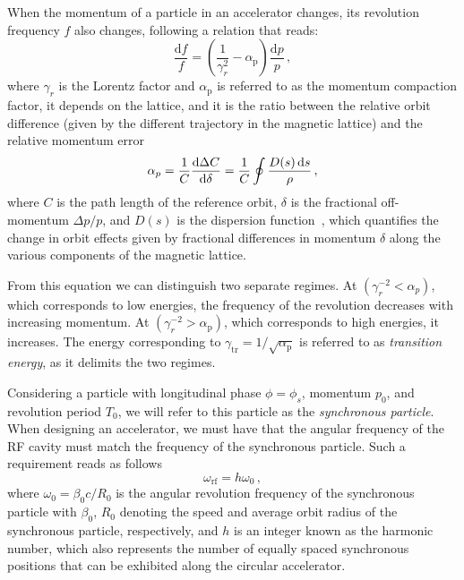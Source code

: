 When the momentum of a particle in an accelerator changes, its revolution frequency $f$ also changes, following a relation that reads:
\begin{equation}
    \frac{\mathrm{d} f}{f}=\left(\frac{1}{\gamma_r^2}-\alpha_{\mathrm{p}}\right) \frac{\mathrm{d} p}{p}\,,
\end{equation}
where $\gamma_r$ is the Lorentz factor and $\alpha_{\mathrm{p}}$ is referred to as the momentum compaction factor, it depends on the lattice, and it is the ratio between the relative orbit difference (given by the different trajectory in the magnetic lattice) and the relative momentum error
\begin{equation}
    \alpha_p = \frac{1}{C}\dv{\Delta C}{\delta} = \frac{1}{C} \oint \frac{{D}(s)\,\mathrm{d}s}{\rho}\,,
\end{equation}
where $C$ is the path length of the reference orbit, $\delta$ is the fractional off-momentum $\Delta p / p$, and ${D}(s)$ is the dispersion function~\cite{Lee:2651939}, which quantifies the change in orbit effects given by fractional differences in momentum $\delta$ along the various components of the magnetic lattice.

From this equation we can distinguish two separate regimes. At $\left(\gamma_r^{-2}<\alpha_p\right)$, which corresponds to low energies, the frequency of the revolution decreases with increasing momentum. At $\left(\gamma_r^{-2}>\alpha_{\mathrm{p}}\right)$, which corresponds to high energies, it increases. The energy corresponding to $\gamma_{\mathrm{tr}}=1 / \sqrt{\alpha_{\mathrm{p}}}$ is referred to as \textit{transition energy}, as it delimits the two regimes. %

Considering a particle with longitudinal phase $\phi=\phi_s$, momentum $p_0$, and revolution period $T_0$, we will refer to this particle as the \textit{synchronous particle}. When designing an accelerator, we must have that the angular frequency of the RF cavity must match the frequency of the synchronous particle. Such a requirement reads as follows
\begin{equation}
    \omega_{\mathrm{rf}}=h \omega_0\,,
\end{equation}
where $\omega_0=\beta_0 c / R_0$ is the angular revolution frequency of the synchronous particle with $\beta_0$, $R_0$ denoting the speed and average orbit radius of the synchronous particle, respectively, and $h$ is an integer known as the harmonic number, which also represents the number of equally spaced synchronous positions that can be exhibited along the circular accelerator.

